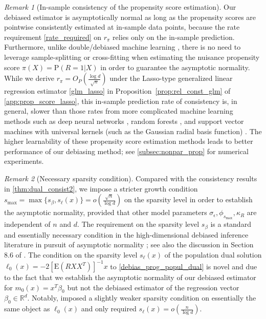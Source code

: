 \documentclass[ejsv2,noshowframe]{imsart}
\theoremstyle{plain}
\theoremstyle{definition}
\theoremstyle{remark}
\newtheorem{remark}{Remark}
\begin{document}
\begin{remark}[In-sample consistency of the propensity score estimation]
	\label{remark:benign_overfit}
	Our debiased estimator is asymptotically normal as long as the propensity scores are pointwise consistently estimated at in-sample data points, because the rate requirement \eqref{rate_required} on $r_{\pi}$ relies only on the in-sample prediction. Furthermore, unlike double/debiased machine learning \citep{chernozhukov2018double}, there is no need to leverage sample-splitting or cross-fitting when estimating the nuisance propensity score $\pi(X)=\mathrm{P}(R=1|X)$ in order to guarantee the asymptotic normality. While we derive $r_{\pi} = O_P\left(\frac{\log d}{\sqrt{n}}\right)$ under the Lasso-type generalized linear regression estimator \eqref{glm_lasso} in Proposition~\ref{prop:rel_const_glm} of \autoref{app:prop_score_lasso}, this in-sample prediction rate of consistency is, in general, slower than those rates from more complicated machine learning methods such as deep neural networks \citep{farrell2021deep}, random forests \citep{gao2022towards}, and support vector machines with universal kernels (such as the Gaussian radial basis function) \citep{steinwart2001influence}. The higher learnability of these propensity score estimation methods leads to better performance of our debiasing method; see \autoref{subsec:nonpar_prop} for numerical experiments.
\end{remark}


\begin{remark}[Necessary sparsity condition]
	Compared with the consistency results in \autoref{thm:dual_consist2}, we impose a stricter growth condition $s_{\max}=\max\{s_{\beta}, s_{\ell}(x)\}=o\left(\frac{\sqrt{n}}{\log d} \right)$ on the sparsity level in order to establish the asymptotic normality, provided that other model parameters $\sigma_{\epsilon},\phi_{s_{\max}},\kappa_R$ are independent of $n$ and $d$. The requirement on the sparsity level $s_{\beta}$ is a standard and essentially necessary condition in the high-dimensional debiased inference literature in pursuit of asymptotic normality \citep{van2014asymptotically,javanmard2014confidence,javanmard2018debiasing,cai2023statistical}; see also the discussion in Section 8.6 of \cite{jankova2018semiparametric}. 
	The condition on the sparsity level $s_{\ell}(x)$ of the population dual solution $\ell_0(x)=-2\left[\mathrm{E}\left(RXX^T\right)\right]^{-1} x$ to \eqref{debias_prog_popul_dual} is novel and due to the fact that we establish the asymptotic normality of our debiased estimator for $m_0(x)=x^T\beta_0$ but not the debiased estimator of the regression vector $\beta_0\in \mathbb{R}^d$. Notably, \cite{bellec2022biasing} imposed a slightly weaker sparsity condition on essentially the same object as $\ell_0(x)$ and only required $s_\ell(x) = o\left(\frac{n}{\log d} \right)$. 
\end{remark}
\end{document}
